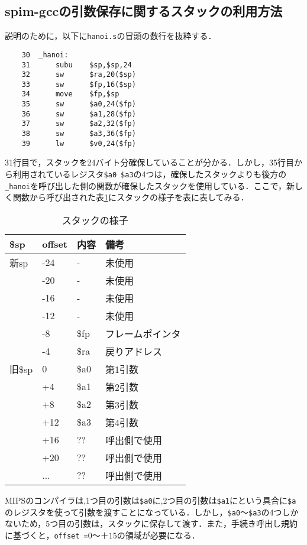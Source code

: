 \documentclass[a4j,11pt]{jarticle}
\begin{document}
  \subsection{spim-gccの引数保存に関するスタックの利用方法}
説明のために，以下に\verb|hanoi.s|の冒頭の数行を抜粋する．
\begin{verbatim}
    30	_hanoi:
    31		subu	$sp,$sp,24
    32		sw	    $ra,20($sp)
    33		sw	    $fp,16($sp)
    34		move	$fp,$sp
    35		sw	    $a0,24($fp)
    36		sw	    $a1,28($fp)
    37		sw	    $a2,32($fp)
    38		sw	    $a3,36($fp)
    39		lw	    $v0,24($fp)
\end{verbatim}
31行目で，スタックを24バイト分確保していることが分かる．しかし，35行目から利用されているレジスタ\verb|$a0|~\verb|$a3|の4つは，確保したスタックよりも後方の\verb|_hanoi|を呼び出した側の関数が確保したスタックを使用している．ここで，新しく関数から呼び出された表\ref{tab:stack}にスタックの様子を表に表してみる．
\begin{table}[htb]
\label{tab:stack}
\centering
\begin{tabular}{|l|l|l|l|}
\hline
\$sp  & offset & 内容   & 備考       \\ \hline
新sp   & -24    & -    & 未使用      \\ \hline
      & -20    & -    & 未使用      \\ \hline
      & -16    & -    & 未使用      \\ \hline
      & -12    & -    & 未使用      \\ \hline
      & -8     & \$fp & フレームポインタ \\ \hline
      & -4     & \$ra & 戻りアドレス   \\ \hline
旧\$sp & 0      & \$a0 & 第1引数     \\ \hline
      & +4     & \$a1 & 第2引数     \\ \hline
      & +8     & \$a2 & 第3引数     \\ \hline
      & +12    & \$a3 & 第4引数     \\ \hline
      & +16    & ??   & 呼出側で使用   \\ \hline
      & +20    & ??   & 呼出側で使用   \\ \hline
      & ...    & ??   & 呼出側で使用   \\ \hline
\end{tabular}
\caption{スタックの様子}
\end{table}
MIPSのコンパイラは,1つ目の引数は\verb|$a0|に,2つ目の引数は\verb|$a1|にという具合に\verb|$a|のレジスタを使って引数を渡すことになっている．しかし，\verb|$a0|〜\verb|$a3|の4つしかないため，5つ目の引数は，スタックに保存して渡す．また，手続き呼出し規約に基づくと，\verb|offset =|$0$〜＋$15$の領域が必要になる．
\end{document}
